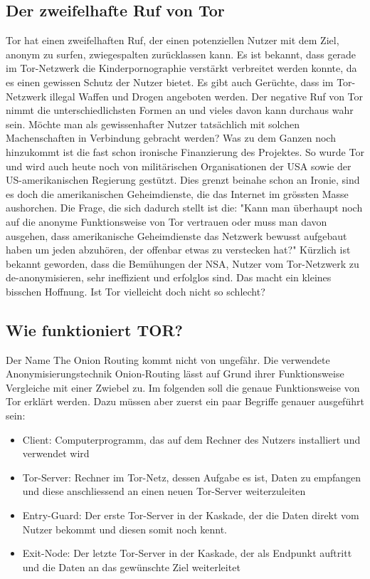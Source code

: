 \subsection{Der zweifelhafte Ruf von Tor}
Tor hat einen zweifelhaften Ruf, der einen potenziellen Nutzer mit dem Ziel, anonym zu surfen, zwiegespalten zurücklassen kann. Es ist bekannt, dass gerade im Tor-Netzwerk die Kinderpornographie verstärkt verbreitet werden konnte, da es einen gewissen Schutz der Nutzer bietet. Es gibt auch Gerüchte, dass im Tor-Netzwerk illegal Waffen und Drogen angeboten werden. Der negative Ruf von Tor nimmt die unterschiedlichsten Formen an und vieles davon kann durchaus wahr sein. Möchte man als gewissenhafter Nutzer tatsächlich mit solchen Machenschaften in Verbindung gebracht werden? Was zu dem Ganzen noch hinzukommt ist die fast schon ironische Finanzierung des Projektes. So wurde Tor und wird auch heute noch von militärischen Organisationen der USA sowie der US-amerikanischen Regierung  gestützt. Dies grenzt beinahe schon an Ironie, sind es doch die amerikanischen Geheimdienste, die das Internet im grössten Masse aushorchen. Die Frage, die sich dadurch stellt ist die: "Kann man überhaupt noch auf die anonyme Funktionsweise von Tor vertrauen oder muss man davon ausgehen, dass amerikanische Geheimdienste das Netzwerk bewusst aufgebaut haben um jeden abzuhören, der offenbar etwas zu verstecken hat?" Kürzlich ist bekannt geworden, dass die Bemühungen der NSA, Nutzer vom Tor-Netzwerk zu de-anonymisieren, sehr ineffizient und erfolglos sind. Das macht ein kleines bisschen Hoffnung. Ist Tor vielleicht doch nicht so schlecht?

\subsection{Wie funktioniert TOR?}
Der Name The Onion Routing kommt nicht von ungefähr. Die verwendete Anonymisierungstechnik Onion-Routing lässt auf Grund ihrer Funktionsweise Vergleiche mit einer Zwiebel zu. Im folgenden soll die genaue Funktionsweise von Tor erklärt werden. Dazu müssen aber zuerst ein paar Begriffe genauer ausgeführt sein:
\begin{itemize}
\item Client: Computerprogramm, das auf dem Rechner des Nutzers installiert und verwendet wird
\item Tor-Server: Rechner im Tor-Netz, dessen Aufgabe es ist, Daten zu empfangen und diese anschliessend an einen neuen Tor-Server weiterzuleiten
\item Entry-Guard: Der erste Tor-Server in der Kaskade, der die Daten direkt vom Nutzer bekommt und diesen somit noch kennt.
\item Exit-Node: Der letzte Tor-Server in der Kaskade, der als Endpunkt auftritt und die Daten an das gewünschte Ziel weiterleitet
\end{itemize}

